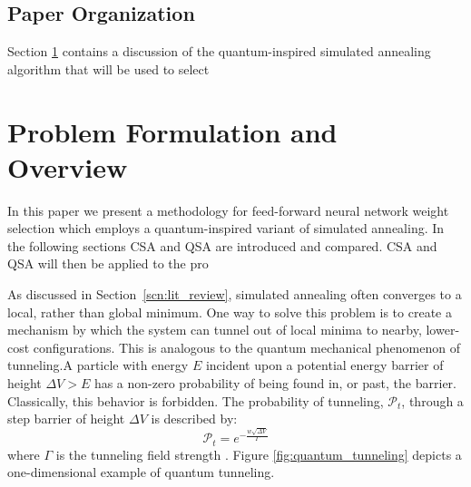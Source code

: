 \documentclass[10pt,journal,cspaper,compsoc]{IEEEtran}
\begin{document}
\subsection{Paper Organization}
\label{scn:paper_organization}
Section \ref{scn:problem_formulation} contains a discussion of the quantum-inspired simulated annealing algorithm that will be used to select 

\section{Problem Formulation and Overview}
\label{scn:problem_formulation}

In this paper we present a methodology for feed-forward neural network weight selection which employs a quantum-inspired variant of simulated annealing. In the following sections CSA and QSA are introduced and compared. CSA and QSA will then be applied to the pro

As discussed in Section~\ref{scn:lit_review}, simulated annealing often converges to a local, rather than global minimum. One way to solve this problem is to create a mechanism by which the system can tunnel out of local minima to nearby, lower-cost configurations. This is analogous to the quantum mechanical phenomenon of tunneling.A particle with energy \begin{math} E \end{math} incident upon a potential energy barrier of height \begin{math} \Delta V > E  \end{math} has a non-zero probability of being found in, or past, the barrier. Classically, this behavior is forbidden. The probability of tunneling, \begin{math} \mathcal{P}_t \end{math}, through a step barrier of height \begin{math} \Delta V  \end{math} is described by: 
\begin{equation} \label{eq:quantum_transition_prob}
\mathcal{P}_t = e^{-\frac{w \sqrt{\Delta V}}{ \Gamma}} 
\end{equation} where \begin{math} \Gamma \end{math} is the tunneling field strength \cite{mukherjee2015multivariatesearchqa}. Figure \ref{fig:quantum_tunneling} depicts a one-dimensional example of quantum tunneling.
\end{document}
